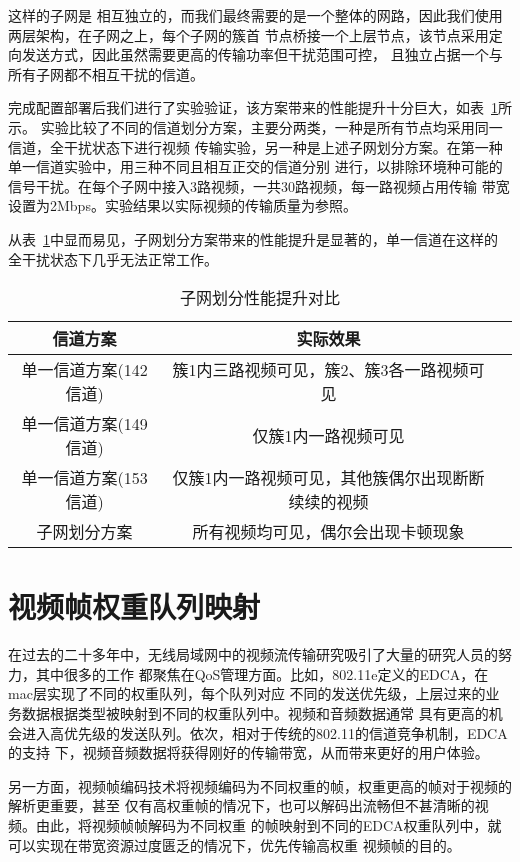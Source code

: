 这样的子网是
相互独立的，而我们最终需要的是一个整体的网路，因此我们使用两层架构，在子网之上，每个子网的簇首
节点桥接一个上层节点，该节点采用定向发送方式，因此虽然需要更高的传输功率但干扰范围可控，
且独立占据一个与所有子网都不相互干扰的信道。

完成配置部署后我们进行了实验验证，该方案带来的性能提升十分巨大，如表~\ref{tab:subnet_comp}所示。
实验比较了不同的信道划分方案，主要分两类，一种是所有节点均采用同一信道，全干扰状态下进行视频
传输实验，另一种是上述子网划分方案。在第一种单一信道实验中，用三种不同且相互正交的信道分别
进行，以排除环境种可能的信号干扰。在每个子网中接入3路视频，一共30路视频，每一路视频占用传输
带宽设置为2Mbps。实验结果以实际视频的传输质量为参照。

从表~\ref{tab:subnet_comp}中显而易见，子网划分方案带来的性能提升是显著的，单一信道在这样的
全干扰状态下几乎无法正常工作。
\begin{table}[htbp]
  \centering
  \caption{子网划分性能提升对比}
  \label{tab:subnet_comp}
  \begin{tabular}{|c|c|c|}
  \hline
  信道方案 & 实际效果 \\
  \hline
  单一信道方案(142信道) & 簇1内三路视频可见，簇2、簇3各一路视频可见 \\
  \hline
  单一信道方案(149信道) & 仅簇1内一路视频可见 \\
  \hline
  单一信道方案(153信道) & 仅簇1内一路视频可见，其他簇偶尔出现断断续续的视频 \\
  \hline
  子网划分方案 & 所有视频均可见，偶尔会出现卡顿现象 \\
  \hline
  \end{tabular}
\end{table}

\section{视频帧权重队列映射}
在过去的二十多年中，无线局域网中的视频流传输研究吸引了大量的研究人员的努力，其中很多的工作
都聚焦在QoS管理方面。比如，802.11e定义的EDCA，在mac层实现了不同的权重队列，每个队列对应
不同的发送优先级，上层过来的业务数据根据类型被映射到不同的权重队列中。视频和音频数据通常
具有更高的机会进入高优先级的发送队列。依次，相对于传统的802.11的信道竞争机制，EDCA的支持
下，视频音频数据将获得刚好的传输带宽，从而带来更好的用户体验。

另一方面，视频帧编码技术将视频编码为不同权重的帧，权重更高的帧对于视频的解析更重要，甚至
仅有高权重帧的情况下，也可以解码出流畅但不甚清晰的视频。由此，将视频帧帧解码为不同权重
的帧映射到不同的EDCA权重队列中，就可以实现在带宽资源过度匮乏的情况下，优先传输高权重
视频帧的目的。

